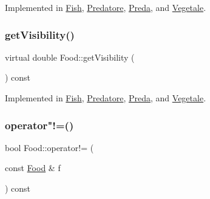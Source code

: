 Implemented in \hyperlink{classFish_ac67e28c25b3d1d401531d428783c5a71_ac67e28c25b3d1d401531d428783c5a71}{Fish}, \hyperlink{classPredatore_a9317be30d28ab61d3f7472f2b1183ba3_a9317be30d28ab61d3f7472f2b1183ba3}{Predatore}, \hyperlink{classPreda_af2140afa941b41f11552b7ac23ecfca8_af2140afa941b41f11552b7ac23ecfca8}{Preda}, and \hyperlink{classVegetale_a6f174aa44bf87ea44f3737390f1e6490_a6f174aa44bf87ea44f3737390f1e6490}{Vegetale}.

\mbox{\label{classFood_a81af14eff9dc5ce73dae309f04b20ccd_a81af14eff9dc5ce73dae309f04b20ccd}} 
\subsubsection{\texorpdfstring{get\+Visibility()}{getVisibility()}}
{\footnotesize\ttfamily virtual double Food\+::get\+Visibility (\begin{DoxyParamCaption}{ }\end{DoxyParamCaption}) const\hspace{0.3cm}{\ttfamily [pure virtual]}}



Implemented in \hyperlink{classFish_a6c20ea483d1f6237ebf01aee3f2b6e88_a6c20ea483d1f6237ebf01aee3f2b6e88}{Fish}, \hyperlink{classPredatore_a1df89e4272f6cae88ffb445d12112a09_a1df89e4272f6cae88ffb445d12112a09}{Predatore}, \hyperlink{classPreda_aa784b4d7c670d6ca48eac616b94d9753_aa784b4d7c670d6ca48eac616b94d9753}{Preda}, and \hyperlink{classVegetale_a4e4528535441df5619648d279ad81306_a4e4528535441df5619648d279ad81306}{Vegetale}.

\mbox{\label{classFood_abf50e88ce6cc0db8c43dfb42d2978b01_abf50e88ce6cc0db8c43dfb42d2978b01}} 
\subsubsection{\texorpdfstring{operator"!=()}{operator!=()}}
{\footnotesize\ttfamily bool Food\+::operator!= (\begin{DoxyParamCaption}\item[{const \hyperlink{classFood}{Food} \&}]{f }\end{DoxyParamCaption}) const}

